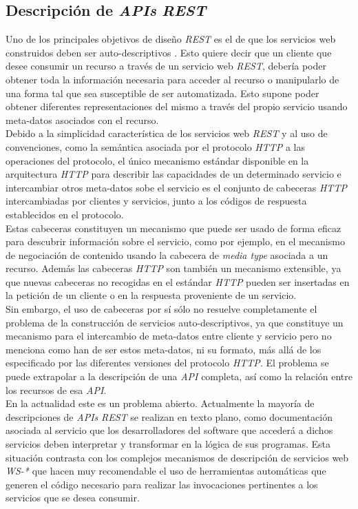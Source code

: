 \subsection{Descripci\'on de \textit{APIs} \textit{REST}}

Uno de los principales objetivos de dise\~no \textit{REST} es el de que los servicios web construidos deben ser auto-descriptivos \cite{berners1997axioms}. Esto quiere decir que un cliente que desee consumir un recurso a trav\'es de un servicio web \textit{REST}, deber\'ia poder obtener toda la informaci\'on necesaria para acceder al recurso o manipularlo de una forma tal que sea susceptible de ser automatizada. Esto supone poder obtener diferentes representaciones del mismo a trav\'es del propio servicio usando meta-datos asociados con el recurso.\\
Debido a la simplicidad caracter\'istica de los servicios web \textit{REST} y al uso de convenciones, como la sem\'antica asociada por el protocolo \textit{HTTP} a las operaciones del protocolo, el  \'unico mecanismo est\'andar disponible en la arquitectura \textit{HTTP} para describir las capacidades de un determinado servicio e intercambiar otros meta-datos sobe el servicio es el conjunto de cabeceras \textit{HTTP} intercambiadas por clientes y servicios, junto a los c\'odigos de respuesta establecidos en el protocolo.\\
Estas cabeceras constituyen un mecanismo que puede ser usado de forma eficaz para descubrir informaci\'on sobre el servicio, como por ejemplo, en el mecanismo de negociaci\'on de contenido usando la cabecera de \textit{media type} asociada a un recurso. Adem\'as las cabeceras \textit{HTTP} son tambi\'en un mecanismo extensible, ya que nuevas cabeceras no recogidas en el est\'andar \textit{HTTP} pueden ser insertadas en la petici\'on de un cliente o en la respuesta proveniente de un servicio.\\
Sin embargo, el uso de cabeceras por s\'i s\'olo no resuelve completamente el problema de la construcci\'on de servicios auto-descriptivos, ya que constituye un mecanismo para el intercambio de meta-datos entre cliente y servicio pero no menciona como han de ser estos meta-datos, ni su formato, m\'as all\'a de los especificado por las diferentes versiones del protocolo \textit{HTTP}.
El problema se puede extrapolar a la descripci\'on de una \textit{API} completa, as\'i como la relaci\'on entre los recursos de esa \textit{API}.\\
En la actualidad este es un problema abierto. Actualmente la mayor\'ia de descripciones de \textit{APIs} \textit{REST} se realizan en texto plano, como documentaci\'on asociada al servicio que los desarrolladores del software que acceder\'a a dichos servicios deben interpretar y transformar en la l\'ogica de sus programas. Esta situaci\'on contrasta con los complejos mecanismos de descripci\'on de servicios web \textit{WS-*} que hacen muy recomendable el uso de herramientas autom\'aticas que generen el c\'odigo necesario para realizar las invocaciones pertinentes a los servicios que se desea consumir. \\
